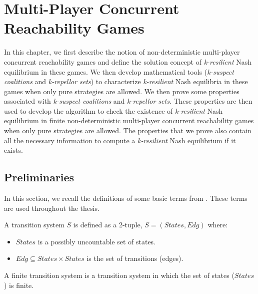 \chapter{Multi-Player Concurrent Reachability Games}

In this chapter, we first describe the notion of non-deterministic multi-player concurrent reachability games and define the solution concept of \textit{k-resilient} Nash equilibrium in these games. We then develop mathematical tools (\textit{k-suspect coalitions} and \textit{k-repellor sets}) to characterize \textit{k-resilient} Nash equilibria in these games when only pure strategies are allowed. We then prove some properties associated with \textit{k-suspect coalitions} and \textit{k-repellor sets}. These properties are then used to develop the algorithm to check the existence of \textit{k-resilient} Nash equilibrium in finite non-deterministic multi-player concurrent reachability games when only pure strategies are allowed. The properties that we prove also contain all the necessary information to compute a \textit{k-resilient} Nash equilibrium if it exists.

\section{Preliminaries}

In this section, we recall the definitions of some basic terms from \cite{BBM-concur10,BBM-report}. These terms are used throughout the thesis.

\begin{definition}
\label{def:transitionsystem}
A transition system $S$ is defined as a 2-tuple, $S = (States, Edg)$ where:
\begin{itemize}
\item $States$ is a possibly uncountable set of states.
\item $Edg \subseteq States \times States$ is the set of transitions (edges).
\end{itemize}
\end{definition}

A finite transition system is a transition system in which the set of states ($States$) is finite.

